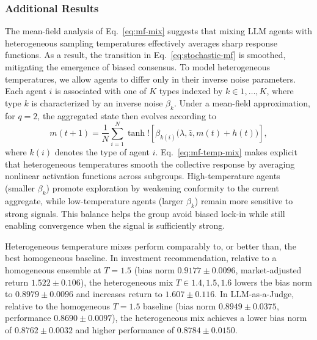 \documentclass{article}
\theoremstyle{plain}
\theoremstyle{definition}
\theoremstyle{remark}
\begin{document}
\subsubsection{Additional Results}\label{sec:real-additional-results}
The mean-field analysis of Eq.~\eqref{eq:mf-mix} suggests that mixing LLM agents with heterogeneous sampling temperatures effectively averages sharp response functions.
As a result, the transition in Eq.~\eqref{eq:stochastic-mf} is smoothed, mitigating the emergence of biased consensus.
To model heterogeneous temperatures, we allow agents to differ only in their inverse noise parameters.
Each agent $i$ is associated with one of $K$ types indexed by $k\in{1,\dots,K}$, where type $k$ is characterized by an inverse noise $\beta_k$.
Under a mean-field approximation, for $q=2$, the aggregated state then evolves according to
{\small\begin{equation}\label{eq:mf-temp-mix}
m(t+1)=\frac{1}{N}\sum_{i=1}^{N}\tanh!\left[\beta_{k(i)}
\bigl(\lambda,\bar{z},m(t)+h(t)\bigr)\right],
\end{equation}}
\hspace{-1mm}where $k(i)$ denotes the type of agent $i$.
Eq.~\eqref{eq:mf-temp-mix} makes explicit that heterogeneous temperatures smooth the collective response by averaging nonlinear activation functions across subgroups.
High-temperature agents (smaller $\beta_{k}$) promote exploration by weakening conformity to the current aggregate, while low-temperature agents (larger $\beta_{k}$) remain more sensitive to strong signals.
This balance helps the group avoid biased lock-in while still enabling convergence when the signal is sufficiently strong.

Heterogeneous temperature mixes perform comparably to, or better than, the best homogeneous baseline.
In investment recommendation, relative to a homogeneous ensemble at $T=1.5$ (bias norm $0.9177 \pm 0.0096$, market-adjusted return $1.522 \pm 0.106$), the heterogeneous mix $T\in{1.4,1.5,1.6}$ lowers the bias norm to $0.8979 \pm 0.0096$ and increases return to $1.607 \pm 0.116$.
In LLM-as-a-Judge, relative to the homogeneous $T=1.5$ baseline (bias norm $0.8949 \pm 0.0375$, performance $0.8690 \pm 0.0097$), the heterogeneous mix achieves a lower bias norm of $0.8762 \pm 0.0032$ and higher performance of $0.8784 \pm 0.0150$.
\end{document}
